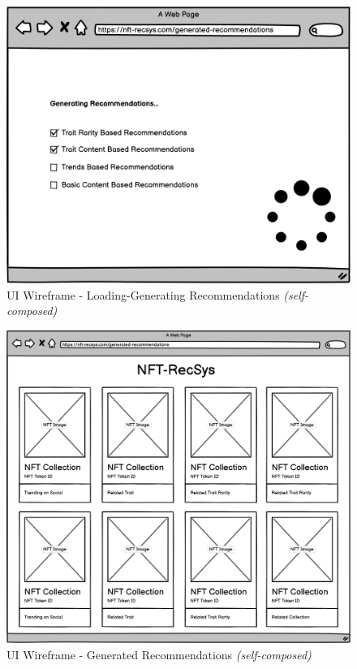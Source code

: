\begin{figure}[h!]
\centering
\includegraphics[width=\textwidth]{images/appendix/UI Wireframes/Loading-Generating Recommendations.png}
\caption{UI Wireframe - Loading-Generating Recommendations \textit{(self-composed)}}
\end{figure}

\begin{figure}[h!]
\centering
\includegraphics[width=\textwidth]{images/appendix/UI Wireframes/Generated Recommendations.png}
\caption{UI Wireframe - Generated Recommendations \textit{(self-composed)}}
\end{figure}


